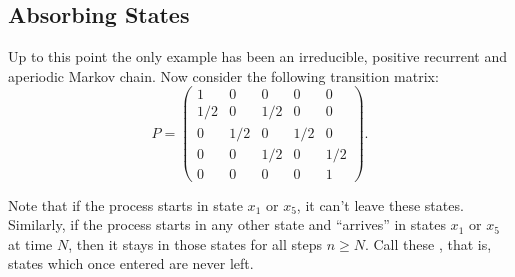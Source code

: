 \documentclass[12pt]{article}
\begin{document}

\subsection*{Absorbing States} Up to this point the only example has
been an irreducible, positive recurrent and aperiodic Markov chain. Now
consider the following transition matrix:
\[
    P =
    \begin{pmatrix}
        1 & 0 & 0 & 0 & 0 \\
        1/2 & 0 & 1/2 & 0 & 0 \\
        0 & 1/2 & 0 & 1/2 & 0 \\
        0 & 0& 1/2 & 0 & 1/2 \\
        0 & 0 & 0 & 0 & 1
    \end{pmatrix}
    .
\]

Note that if the process starts in state \( x_1 \) or \( x_5 \), it
can't leave these states.  Similarly, if the process starts in any other
state and ``arrives'' in states \( x_1 \) or \( x_5 \) at time \( N \),
then it stays in those states for all steps \( n\geq N \).  Call these
,%
that is, states which once entered are never left.
\end{document}
